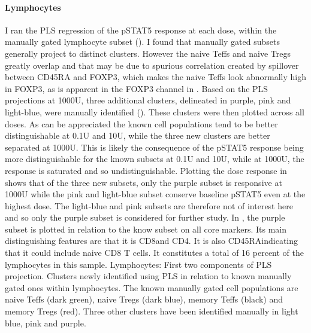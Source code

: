 \paragraph{Lymphocytes} 
I ran the PLS regression of the pSTAT5 response at each dose, within the manually gated lymphocyte subset ().
I found that manually gated subsets generally project to distinct clusters.
However the naive Teffs and naive Tregs greatly overlap and that may be due to spurious correlation created by
spillover between CD45RA and FOXP3, which makes the naive Teffs look abnormally high in FOXP3,
as is apparent in the FOXP3 channel in .
Based on the \gls{PLS} projections at 1000U, three additional clusters, delineated in purple, pink and light-blue, were manually identified
().  These clusters were then plotted across all doses.
As can be appreciated the known cell populations tend to be better distinguishable at 0.1U and 10U,
while the three new clusters are better separated at 1000U.  This is likely the consequence of the pSTAT5 response being more distinguishable
for the known subsets at 0.1U and 10U, while at 1000U, the response is saturated and so undistinguishable.
Plotting the dose response in  shows that of the three new subsets, only the purple subset is
responsive at 1000U while the pink and light-blue subset conserve baseline pSTAT5 even at the highest dose.
The light-blue and pink subsets are therefore not of interest here and so only the purple subset is considered for further study.
In , the purple subset is plotted in relation to the know subset on all core markers.
Its main distinguishing features are that it is CD8\positive and CD4\negative.
It is also CD45RA\positive indicating that it could include naive CD8 T cells.
It constitutes a total of 16 percent of the lymphocytes in this sample.
{ Lymphocytes: First two components of \gls{PLS} projection.  Clusters newly identified using \gls{PLS} in relation to known manually gated ones within lymphocytes. }
{
The known manually gated cell populations are naive Teffs (dark green), naive Tregs (dark blue), memory Teffs (black) and memory Tregs (red).
Three other clusters have been identified manually in light blue, pink and purple.
}

